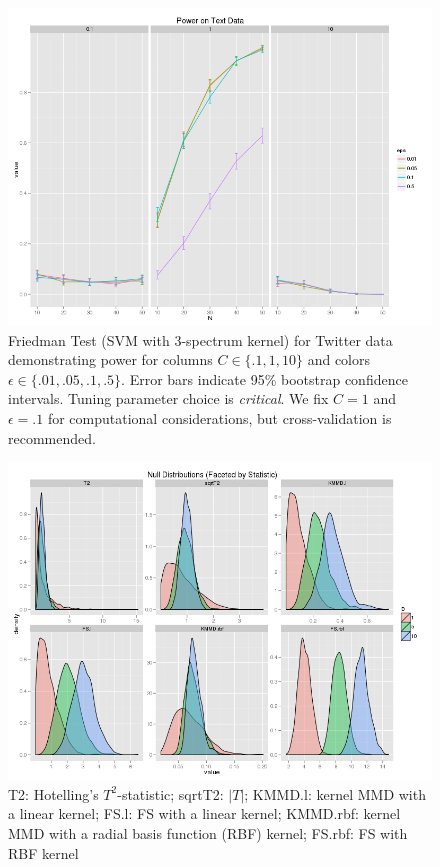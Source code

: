 \begin{figure}
  \centering
  \includegraphics[width=\linewidth]{power_kpar.png}
  \caption{Friedman Test (SVM with 3-spectrum kernel) for Twitter data
    demonstrating power for columns $C \in \{.1, 1, 10\}$ and colors
    $\epsilon \in \{.01, .05, .1, .5\}$.  Error bars indicate 95\%
    bootstrap confidence intervals.  Tuning parameter choice is
    \emph{critical}.  We fix $C = 1$ and $\epsilon = .1$ for
    computational considerations, but cross-validation is
    recommended.}
  \label{fig:power_kpar}
\end{figure}

\begin{figure}
  \centering
  \includegraphics[width=.8\linewidth]{null_dist.png}
  \caption{T2: Hotelling's $T^2$-statistic; sqrtT2: $|T|$;
    KMMD.l: kernel MMD with a linear kernel; FS.l: FS with a
  linear kernel; KMMD.rbf: kernel MMD with a radial basis function (RBF) kernel;
  FS.rbf: FS with RBF kernel}
  \label{fig:null_dist}
\end{figure}

